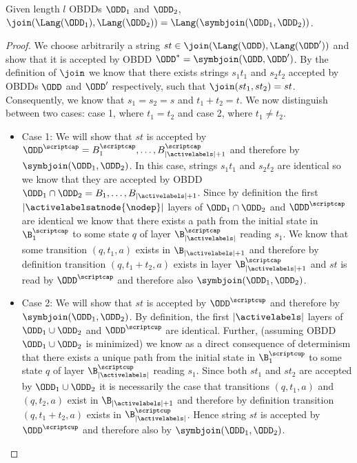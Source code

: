\begin{lemma}
\label{lemma:SymbolicJoin}
Given length $l$ OBDDs $\ODD_1$ and $\ODD_2$, $\join(\Lang(\ODD_1),\Lang(\ODD_2)) = \Lang(\symbjoin(\ODD_1,\ODD_2))$.
\end{lemma}

\begin{proof}
    We choose arbitrarily a  string $st \in \join(\Lang(\ODD),\Lang(\ODD'))$ and show that it is accepted by OBDD $\ODD^* = \symbjoin(\ODD,\ODD')$.
    By the definition of $\join$ we know that there exists strings $s_1t_1$ and $s_2t_2$ accepted by OBDDs $\ODD$ and $\ODD'$ respectively, such that $\join(st_1,st_2) = st$. Consequently, we know that $s_1 = s_2 = s$ and $t_1 +t_2 = t$. We now distinguish between two cases: case 1, where $t_1 = t_2$ and case 2, where $t_1 \neq t_2$.
    \begin{itemize}
        \item Case 1: We will show that $st$ is accepted by $\ODD^\scriptcap = B_1^{\scriptcap},\ldots,B_{|\activelabels|+1}^{\scriptcap}$ and therefore by $\symbjoin(\ODD_1,\ODD_2)$. In this case, strings $s_1t_1$ and $s_2t_2$ are identical so we know that they are accepted by OBDD $\ODD_1 \cap \ODD_2 = B_1,\ldots,B_{|\activelabels|+1}$. Since by definition the first $|\activelabelsatnode{\nodep}|$ layers of $\ODD_1 \cap \ODD_2$ and $\ODD^\scriptcap$ are identical we know that there exists a path from the initial state in $\B^\scriptcap_1$ to some state $q$ of layer $\B_{|\activelabels|}^\scriptcap$ reading $s_1$. We know that some transition $(q,t_1,a)$ exists in $\B_{|\activelabels|+1}$ and therefore by definition transition $(q,t_1+t_2,a)$ exists in layer $\B_{|\activelabels|+1}^\scriptcap$ and $st$ is read by $\ODD^\scriptcap$ and therefore also $\symbjoin(\ODD_1,\ODD_2)$.
        
        \item Case 2: We will show that $st$ is accepted by $\ODD^\scriptcup$ and therefore by $\symbjoin(\ODD_1,\ODD_2)$. By definition, the first $|\activelabels|$ layers of $\ODD_1 \cup \ODD_2$ and $\ODD^\scriptcup$ are identical. Further, (assuming OBDD $\ODD_1 \cup \ODD_2$ is minimized) we know as a direct consequence of determinism that there exists a unique path from the initial state in $\B^\scriptcup_1$ to some state $q$ of layer $\B_{|\activelabels|}^\scriptcup$ reading $s_1$. Since both $st_1$ and $st_2$ are accepted by $\ODD_1 \cup \ODD_2$ it is necessarily the case that transitions $(q, t_1, a)$ and $(q,t_2,a)$ exist in $\B_{|\activelabels|+1}$ and therefore by definition transition $(q,t_1 + t_2,a)$ exists in $\B_{|\activelabels|}^\scriptcup$. Hence string $st$ is accepted by $\ODD^\scriptcup$ and therefore also by $\symbjoin(\ODD_1,\ODD_2)$.
    \end{itemize}


\end{proof}
